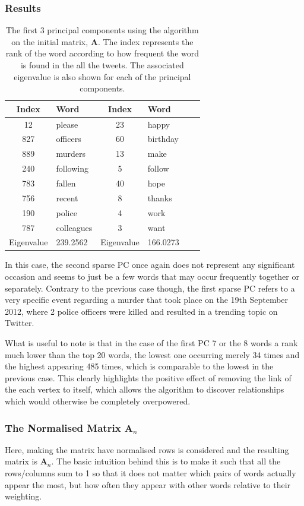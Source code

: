 \documentclass[11pt,a4paper]{article}
\begin{document}
\subsubsection*{Results}
\begin{table}[H]
\center
\begin{tabular}{| c l | c l | c l |}
\hline
Index & Word & Index & Word\\
\hline
12 & please & 23 & happy \\
827 & officers & 60 & birthday \\
889 & murders & 13 & make \\
240 & following & 5 & follow\\
783 & fallen & 40 & hope\\
756 & recent & 8 & thanks\\ 
190 & police & 4 & work\\
787 & colleagues & 3 & want\\
\hline
Eigenvalue & 239.2562  & Eigenvalue & 166.0273 \\
\hline
\end{tabular}
\caption{The first 3 principal components using the algorithm on the initial matrix, $ \mathbf{A}$. The index represents the rank of the word according to how frequent the word is found in the all the tweets. The associated eigenvalue is also shown for each of the principal components.}
\end{table}

In this case, the second sparse PC once again does not represent any significant occasion and seems to just be a few words that may occur frequently together or separately. Contrary to the previous case though, the first sparse PC refers to a very specific event regarding a murder that took place on the 19th September 2012, where 2 police officers were killed and resulted in a trending topic on Twitter. 

What is useful to note is that in the case of the first PC 7 or the 8 words a rank much lower than the top 20 words, the lowest one occurring merely 34 times and the highest appearing 485 times, which is comparable to the lowest in the previous case. This clearly highlights the positive effect of removing the link of the each vertex to itself, which allows the algorithm to discover relationships which would otherwise be completely overpowered. 

\subsubsection{The Normalised Matrix $\mathbf{A}_{n}$}
Here, making the matrix have normalised rows is considered and the resulting matrix is $\mathbf{A}_n$. The basic intuition behind this is to make it such that all the rows/columns sum to 1 so that it does not matter which pairs of words actually appear the most, but how often they appear with other words relative to their weighting.
\end{document}
